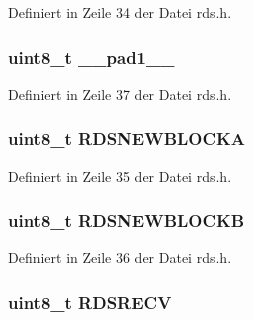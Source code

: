 Definiert in Zeile 34 der Datei rds.\+h.

\hypertarget{structinfo_a77f12d2e278bd5c07712648ac0df5e08}{}
\subsubsection[{\+\_\+\+\_\+pad1\+\_\+\+\_\+}]{\setlength{\rightskip}{0pt plus 5cm}uint8\+\_\+t \+\_\+\+\_\+pad1\+\_\+\+\_\+}\label{structinfo_a77f12d2e278bd5c07712648ac0df5e08}


Definiert in Zeile 37 der Datei rds.\+h.

\hypertarget{structinfo_a62260ece65dc68c2467e5e1b09e5f144}{}
\subsubsection[{R\+D\+S\+N\+E\+W\+B\+L\+O\+C\+K\+A}]{\setlength{\rightskip}{0pt plus 5cm}uint8\+\_\+t R\+D\+S\+N\+E\+W\+B\+L\+O\+C\+K\+A}\label{structinfo_a62260ece65dc68c2467e5e1b09e5f144}


Definiert in Zeile 35 der Datei rds.\+h.

\hypertarget{structinfo_acd71c83a87b1a99a4784dad5f2a9477f}{}
\subsubsection[{R\+D\+S\+N\+E\+W\+B\+L\+O\+C\+K\+B}]{\setlength{\rightskip}{0pt plus 5cm}uint8\+\_\+t R\+D\+S\+N\+E\+W\+B\+L\+O\+C\+K\+B}\label{structinfo_acd71c83a87b1a99a4784dad5f2a9477f}


Definiert in Zeile 36 der Datei rds.\+h.

\hypertarget{structinfo_a56e25cd5c95053ebd95c3c35654680d6}{}
\subsubsection[{R\+D\+S\+R\+E\+C\+V}]{\setlength{\rightskip}{0pt plus 5cm}uint8\+\_\+t R\+D\+S\+R\+E\+C\+V}\label{structinfo_a56e25cd5c95053ebd95c3c35654680d6}


